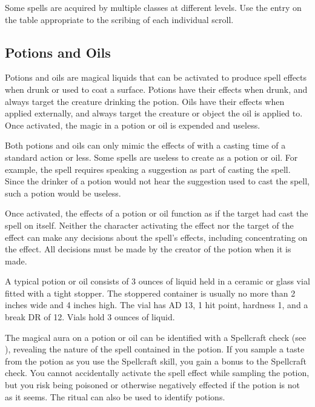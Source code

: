          Some spells are acquired by multiple classes at different levels.
        Use the entry on the table appropriate to the scribing of each individual scroll.

    \subsection{Potions and Oils}

        Potions and oils are magical liquids that can be activated to produce spell effects when drunk or used to coat a surface.
        Potions have their effects when drunk, and always target the creature drinking the potion.
        Oils have their effects when applied externally, and always target the creature or object the oil is applied to.
        Once activated, the magic in a potion or oil is expended and useless.

        Both potions and oils can only mimic the effects of  with a casting time of a standard action or less.
        Some spells are useless to create as a potion or oil.
        For example, the  spell requires speaking a suggestion as part of casting the spell.
        Since the drinker of a  potion would not hear the suggestion used to cast the spell, such a potion would be useless.

        Once activated, the effects of a potion or oil function as if the target had cast the spell on itself.
        Neither the character activating the effect nor the target of the effect can make any decisions about the spell's effects, including concentrating on the effect.
        All decisions must be made by the creator of the potion when it is made.

         A typical potion or oil consists of 3 ounces of liquid held in a ceramic or glass vial fitted with a tight stopper.
        The stoppered container is usually no more than 2 inches wide and 4 inches high.
        The vial has AD 13, 1 hit point, hardness 1, and a break DR of 12.
        Vials hold 3 ounces of liquid.

        The magical aura on a potion or oil can be identified with a Spellcraft check (see ), revealing the nature of the spell contained in the potion.
        If you sample a taste from the potion as you use the Spellcraft skill, you gain a  bonus to the Spellcraft check.
        You cannot accidentally activate the spell effect while sampling the potion, but you risk being poisoned or otherwise negatively effected if the potion is not as it seems.
        The  ritual can also be used to identify potions.

